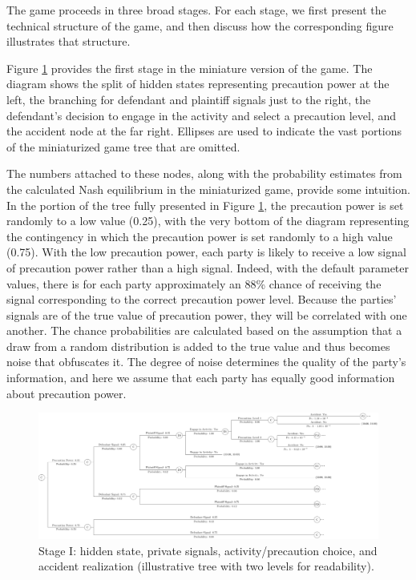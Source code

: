 \documentclass{article}
\begin{document}
The game proceeds in three broad stages. For each stage, we first present the technical structure of the game, and then discuss how the corresponding figure illustrates that structure. 

Figure \ref{fig:smalltree_beginning} provides the first stage in the miniature version of the game. The diagram shows the split of hidden states representing precaution power at the left, the branching for defendant and plaintiff signals just to the right, the defendant’s decision to engage in the activity and select a precaution level, and the accident node at the far right. Ellipses are used to indicate the vast portions of the miniaturized game tree that are omitted. 

The numbers attached to these nodes, along with the probability estimates from the calculated Nash equilibrium in the miniaturized game, provide some intuition. In the portion of the tree fully presented in Figure \ref{fig:smalltree_beginning}, the precaution power is set randomly to a low value (0.25), with the very bottom of the diagram representing the contingency in which the precaution power is set randomly to a high value (0.75). With the low precaution power, each party is likely to receive a low signal of precaution power rather than a high signal. Indeed, with the default parameter values, there is for each party approximately an 88\% chance of receiving the signal corresponding to the correct precaution power level. Because the parties' signals are of the true value of precaution power, they will be correlated with one another. The chance probabilities are calculated based on the assumption that a draw from a random distribution is added to the true value and thus becomes noise that obfuscates it. The degree of noise determines the quality of the party's information, and here we assume that each party has equally good information about precaution power.

  \begin{figure}[t]
    \centering
    \includegraphics[width=\textwidth]{../Figures/smalltree_beginning.pdf}
    \caption{Stage I: hidden state, private signals, activity/precaution choice, and accident realization (illustrative tree with two levels for readability).}
    \label{fig:smalltree_beginning}
  \end{figure}
\end{document}
